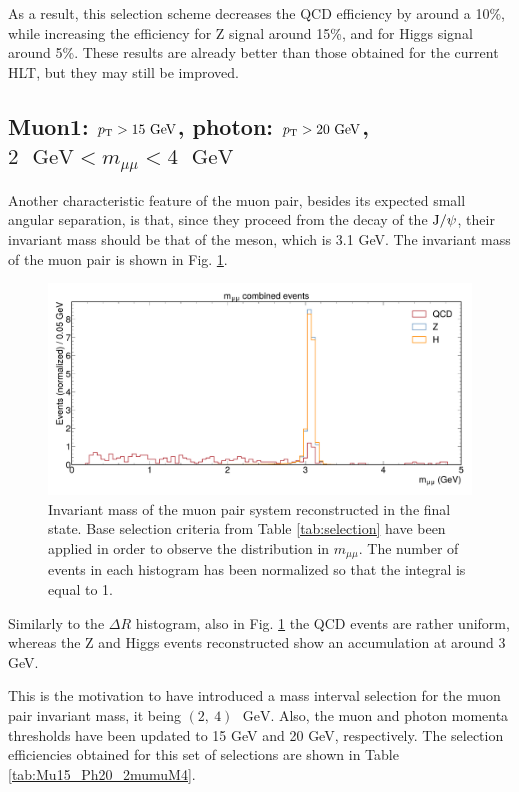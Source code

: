 \documentclass[11pt, a4paper]{article}
\newcommand{\GeV}{\textrm{ }\mathrm{GeV}}
\newcommand{\JPsi}{{\rm J}/\psi}
\newcommand{\pt}{p_{\rm T}}
\begin{document}
As a result, this selection scheme decreases the QCD efficiency by around a 10\%, while increasing the efficiency for Z signal around 15\%, and for Higgs signal around 5\%. These results are already better than those obtained for the current HLT, but they may still be improved.


\subsection{Muon1: $\pt > 15\GeV$, photon: $\pt>20\GeV$, $2\GeV<m_{\mu\mu}<4\GeV$}
Another characteristic feature of the muon pair, besides its expected small angular separation, is that, since they proceed from the decay of the $\JPsi$, their invariant mass should be that of the meson, which is 3.1 GeV. The invariant mass of the muon pair is shown in Fig. \ref{im:m_mumu_combined_TestForCut}.

\begin{figure}[htbp]
    \centering
    \includegraphics[width=.9\linewidth]{images/m_mumu_combined_TestForCut.pdf}
    \caption{Invariant mass of the muon pair system reconstructed in the final state. Base selection criteria from Table \ref{tab:selection} have been applied in order to observe the distribution in $m_{\mu\mu}$. The number of events in each histogram has been normalized so that the integral is equal to 1.
    \label{im:m_mumu_combined_TestForCut}}
\end{figure}

Similarly to the $\Delta R$ histogram, also in Fig. \ref{im:m_mumu_combined_TestForCut} the QCD events are rather uniform, whereas the Z and Higgs events reconstructed show an accumulation at around 3 GeV.

This is the motivation to have introduced a mass interval selection for the muon pair invariant mass, it being $(2,\ 4)\GeV$. Also, the muon and photon momenta thresholds have been updated to 15 GeV and 20 GeV, respectively. The selection efficiencies obtained for this set of selections are shown in Table \ref{tab:Mu15_Ph20_2mumuM4}.
\end{document}

